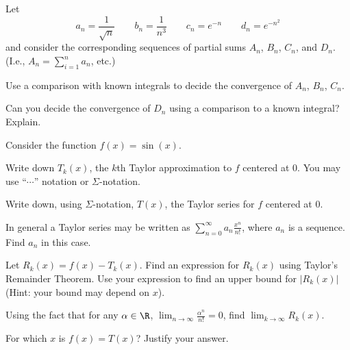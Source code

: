 \documentclass{workbook}
\begin{document}
\begin{slide}
	\question
	Let
	\[
		a_n =\frac{1}{\sqrt{n}}\qquad b_n=\frac{1}{n^3}\qquad c_n=e^{-n}
		\qquad d_n=e^{-n^2}
	\]
	and consider the corresponding sequences of partial sums $A_n$, $B_n$,
	$C_n$, and $D_n$. (I.e., $\displaystyle A_n=\sum_{i=1}^n a_n$, etc.)

	\begin{parts}
		\item Use a comparison with known integrals to decide 
		the convergence of $A_n$, $B_n$, $C_n$.
		\item Can you decide the convergence of $D_n$ using a comparison to
		a known integral? Explain.
	\end{parts}
\end{slide}

\begin{slide}
	\question
	Consider the function $f(x)=\sin(x)$.

	\begin{parts}
		\item Write down $T_k(x)$, the $k$th Taylor approximation to 
		$f$ centered at $0$. You may use ``$\cdots$'' notation or $\Sigma$-notation. 

		\item Write down, using $\Sigma$-notation, $T(x)$, the Taylor series
		for $f$ centered at $0$.

		\item In general a Taylor series may be written as $\displaystyle 
		\sum_{n=0}^\infty a_n \frac{x^{n}}{n!}$, where $a_n$ is a sequence.
		Find $a_n$ in this case.

		\item Let $R_k(x)=f(x)-T_k(x)$. Find an expression for $R_k(x)$
		using Taylor's Remainder Theorem. Use your expression to find an upper bound for $|R_k(x)|$ (Hint: your bound may depend on $x$).
	
		\item Using the fact that for any $\alpha\in \R$, 
		$\displaystyle \lim_{n\to\infty} \frac{\alpha^n}{n!}=0$, 
		find $\displaystyle \lim_{k\to\infty} R_k(x)$.

		\item For which $x$ is $f(x)=T(x)$? Justify your answer.
	\end{parts}
\end{slide}
\end{document}
